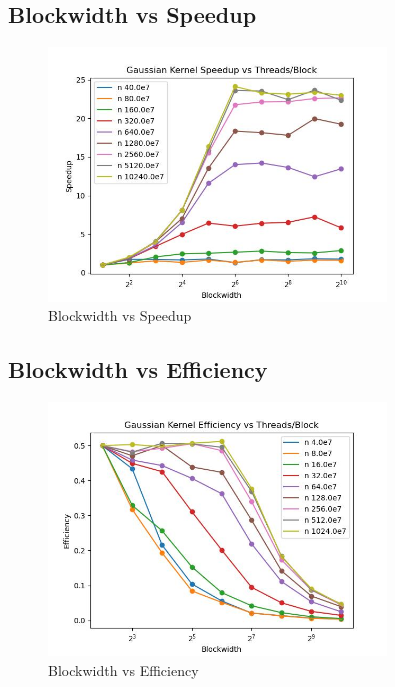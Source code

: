 \documentclass[11pt,a4paper]{article}
\begin{document}
\begin{table}[h!]
    \centering
\end{table}


\subsection{Blockwidth vs Speedup}

\begin{figure}[H]
  \centering
  \includegraphics[width=0.8\textwidth]{"./speedup.jpg"}
  \caption{Blockwidth vs Speedup}
\end{figure}

\begin{table}[h!]
    \centering
\end{table}

\subsection{Blockwidth vs Efficiency}

\begin{figure}[H]
  \centering
  \includegraphics[width=0.8\textwidth]{"./efficiency.jpg"}
  \caption{Blockwidth vs Efficiency}
\end{figure}
\end{document}
